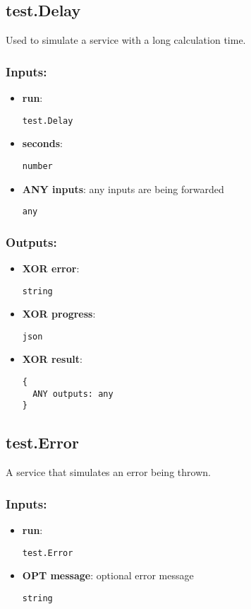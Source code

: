 \subsection{test.Delay}
\label{ch:builtinservices:test.Delay}
Used to simulate a service with a long calculation time.
\subsubsection*{Inputs:}
\begin{itemize}
    \item \textbf{run}: 
\begin{lstlisting}
test.Delay
\end{lstlisting}
    \item \textbf{seconds}: 
\begin{lstlisting}
number
\end{lstlisting}
    \item \textbf{ANY inputs}: any inputs are being forwarded
\begin{lstlisting}
any
\end{lstlisting}
  \end{itemize}

\subsubsection*{Outputs:}
\begin{itemize}
    \item \textbf{XOR error}: 
\begin{lstlisting}
string
\end{lstlisting}
    \item \textbf{XOR progress}: 
\begin{lstlisting}
json
\end{lstlisting}
    \item \textbf{XOR result}: 
\begin{lstlisting}
{
  ANY outputs: any
}
\end{lstlisting}
  \end{itemize}

\subsection{test.Error}
\label{ch:builtinservices:test.Error}
A service that simulates an error being thrown.
\subsubsection*{Inputs:}
\begin{itemize}
    \item \textbf{run}: 
\begin{lstlisting}
test.Error
\end{lstlisting}
    \item \textbf{OPT message}: optional error message
\begin{lstlisting}
string
\end{lstlisting}
  \end{itemize}

